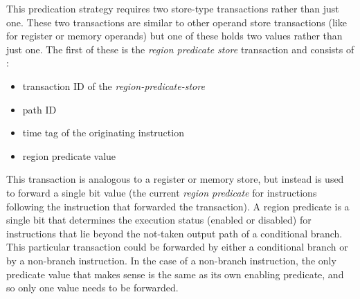 This predication strategy requires two store-type transactions
rather than just one.  These two transactions are similar
to other operand store transactions (like for register or memory
operands)
but one of these holds two values rather than just one.
The first of these is the \textit{region predicate store}
transaction and consists of :
%
\begin{itemize}
\vspace{-0.15in}
\item{transaction ID of the \textit{region-predicate-store}}
\vspace{-0.15in}
\item{path ID}
\vspace{-0.15in}
\item{time tag of the originating instruction}
\vspace{-0.15in}
\item{region predicate value}
\vspace{-0.15in}
\end{itemize}   
%
This transaction is analogous to a register or memory
store, but instead is used to forward a single bit value (the
current \textit{region predicate} for instructions following the
instruction that forwarded the transaction).  A region predicate
is a single bit that determines the execution status
(enabled or disabled) for instructions that lie beyond the
not-taken output path of a conditional branch.
This particular transaction could be forwarded by either
a conditional branch or by a non-branch instruction.
In the
case of a non-branch instruction, the only
predicate value that makes sense is the same as its
own enabling predicate, and so only one value needs
to be forwarded.


